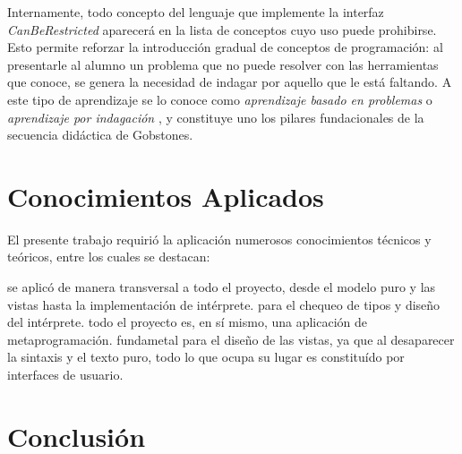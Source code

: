 
Internamente, todo concepto del lenguaje que implemente la interfaz \textit{CanBeRestricted} aparecerá en la lista de conceptos cuyo uso puede prohibirse. Esto permite reforzar la introducción gradual de conceptos de programación: al presentarle al alumno un problema que no puede resolver con las herramientas que conoce, se genera la necesidad de indagar por aquello que le está faltando. A este tipo de aprendizaje se lo conoce como \textit{aprendizaje basado en problemas} o \textit{aprendizaje por indagación} \cite{Inquiry}, y constituye uno los pilares fundacionales de la secuencia didáctica de Gobstones.


\section{Conocimientos Aplicados}\label{conocimientos}

El presente trabajo requirió la aplicación numerosos conocimientos técnicos y teóricos, entre los cuales se destacan:

\begin{itemize}
   se aplicó de manera transversal a todo el proyecto, desde el modelo puro y las vistas hasta la implementación de intérprete.
   para el chequeo de tipos y diseño del intérprete.
   todo el proyecto es, en sí mismo, una aplicación de metaprogramación.
   fundametal para el diseño de las vistas, ya que al desaparecer la sintaxis y el texto puro, todo lo que ocupa su lugar es constituído por interfaces de usuario.
\end{itemize}


\section{Conclusión}\label{conclusion}


